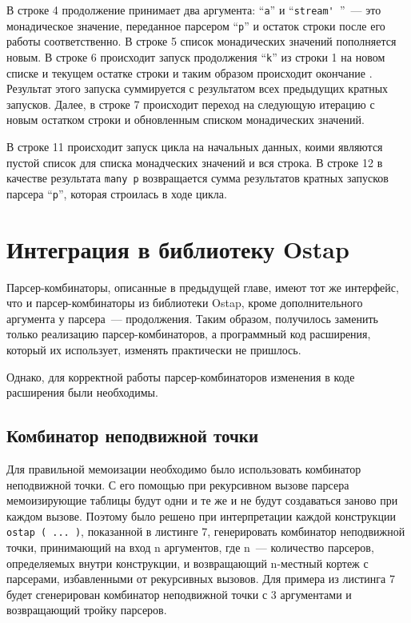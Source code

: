В строке 4 продолжение принимает два аргумента: ``\lstinline|a|'' и ``\lstinline|stream' |''~--- это монадическое значение, переданное парсером ``\lstinline|р|'' и остаток строки после его работы соответственно. В строке 5 список монадических значений пополняется новым. В строке 6 происходит запуск продолжения ``\lstinline|k|'' из строки 1 на новом списке и текущем остатке строки и таким образом происходит окончание . Результат этого запуска суммируется с результатом всех предыдущих кратных запусков. Далее, в строке 7 происходит переход на следующую итерацию с новым остатком строки и обновленным списком монадических  значений.

В строке 11 происходит запуск цикла на начальных данных, коими являются пустой список для списка монадческих значений и вся строка. В строке 12 в качестве результата \lstinline|many p| возвращается сумма результатов кратных запусков парсера ``\lstinline|р|'', которая строилась в ходе цикла.

\section{Интеграция в библиотеку Ostap}

Парсер-комбинаторы, описанные в предыдущей главе, имеют тот же интерфейс, что и парсер-комбинаторы из библиотеки Ostap, кроме дополнительного аргумента у парсера~--- продолжения. Таким образом, получилось заменить только реализацию парсер-комбинаторов, а программный код расширения, который их использует, изменять практически не пришлось.

Однако, для корректной работы парсер-комбинаторов изменения в коде расширения были необходимы.

\subsection{Комбинатор неподвижной точки}

Для правильной мемоизации необходимо было использовать комбинатор неподвижной точки. С его помощью при рекурсивном вызове парсера мемоизирующие таблицы будут одни и те же и не будут создаваться заново при каждом вызове. Поэтому было решено при интерпретации каждой конструкции \lstinline|ostap ( ... )|, показанной в листинге 7, генерировать комбинатор неподвижной точки, принимающий на вход n аргументов, где n~--- количество парсеров, определяемых внутри конструкции, и возвращающий n-местный кортеж с парсерами, избавленными от рекурсивных вызовов. Для примера из листинга 7 будет сгенерирован комбинатор неподвижной точки с 3 аргументами и возвращающий тройку парсеров.

